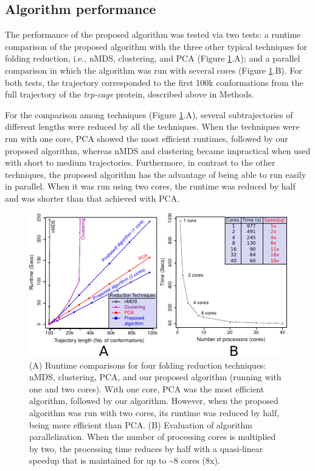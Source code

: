 \documentclass[twocolumn]{bmcart}%
\begin{document}
\subsection*{Algorithm performance}

The performance of the proposed algorithm was tested via two tests: a runtime comparison of the proposed algorithm with the three other typical techniques for folding reduction, i.e., nMDS, clustering, and PCA (Figure \ref{fig:Performance-methods}.A); and a parallel comparison in which the algorithm was run with several cores (Figure \ref{fig:Performance-methods}.B). For both tests, the trajectory corresponded to the first 100k conformations from the full trajectory of the \emph{trp-cage} protein, described above in Methods.

For the comparison among techniques (Figure \ref{fig:Performance-methods}.A), several subtrajectories of different lengths were reduced by all the techniques. When the techniques were run with one core, PCA showed the most efficient runtimes, followed by our proposed algorithm, whereas nMDS and clustering became impractical when used with short to medium trajectories. Furthermore, in contrast to the other techniques, the proposed algorithm has the advantage of being able to run easily in parallel. When it was run using two cores, the runtime was reduced by half and was shorter than that achieved with PCA.

\begin{figure}[th]
\begin{centering}
\includegraphics{images/07-performance-times}
\par\end{centering}
\caption{ (A) Runtime comparisons for four folding reduction techniques: nMDS, clustering, PCA, and our proposed algorithm (running with one and two cores). With one core, PCA was the most efficient algorithm, followed by our algorithm. However, when the proposed algorithm was run with two cores, its runtime was reduced by half, being more efficient than PCA. (B) Evaluation of algorithm parallelization. When the number of processing cores is multiplied by two, the processing time reduces by half with a quasi-linear speedup that is maintained for up to \textasciitilde{}8 cores (8x). \label{fig:Performance-methods}\protect \\
}
\end{figure}
\end{document}
